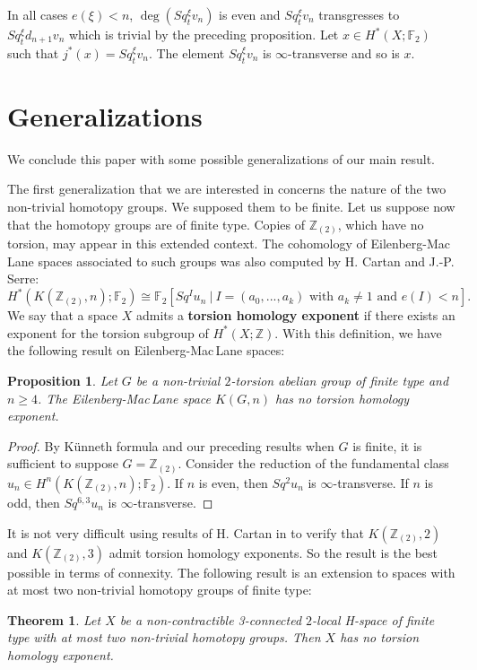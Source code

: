 \documentclass{amsart}
\newtheorem*{thm*}{Theorem}
\newtheorem*{prop*}{Proposition}
\theoremstyle{definition}
\theoremstyle{remark}
\newcommand{\Z}{\mathbb{Z}}
\newcommand{\F}{\mathbb{F}}
\renewcommand{\geq}{\geqslant}
\begin{document}
In all cases $e(\xi)<n$, $\deg(Sq^\xi_t v_n)$ is even and $Sq_{t}^\xi v_n$ transgresses to $Sq_t^\xi d_{n+1}v_n$ which is trivial by the preceding proposition. Let $x\in H^*(X;\F_2)$ such that $j^*(x)=Sq_t^\xi v_n$. The element $Sq_t^\xi v_n$ is $\infty$-transverse and so is $x$.

\section{Generalizations}\label{s:generalizations}

We conclude this paper with some possible generalizations of our main result.

The first generalization that we are interested in concerns the nature of the two non-trivial homotopy groups. We supposed them to be finite. Let us suppose now that the homotopy groups are of finite type. Copies of $\Z_{(2)}$, which have no torsion, may appear in this extended context. The cohomology of Eilenberg-Mac\,Lane spaces associated to such groups was also computed by H. Cartan and J.-P. Serre:
$$
H^*(K(\Z_{(2)},n);\F_2)\cong\F_2[Sq^Iu_n\ |\ \text{$I=(a_0,...,a_k)$ with $a_k\not=1$ and $e(I)<n$}].
$$
We say that a space $X$ admits a {\bf torsion homology exponent} if there exists an exponent for the torsion subgroup of $H^*(X;\Z)$. With this definition, we have the following result on Eilenberg-Mac\,Lane spaces:

\begin{prop*}
Let $G$ be a non-trivial $2$-torsion abelian group of finite type and $n\geq4$. The Eilenberg-Mac\,Lane space $K(G,n)$ has no torsion homology exponent.
\end{prop*}

\begin{proof}
By K\"unneth formula and our preceding results when $G$ is finite, it is sufficient to suppose $G=\Z_{(2)}$. Consider the reduction of the fundamental class $u_n\in H^n(K(\Z_{(2)},n);\F_2)$. If $n$ is even, then $Sq^{2}u_n$ is $\infty$-transverse. If $n$ is odd, then $Sq^{6,3}u_n$ is $\infty$-transverse. 
\end{proof}

It is not very difficult using results of H. Cartan in \cite{Ca55} to verify that $K(\Z_{(2)},2)$ and $K(\Z_{(2)},3)$ admit torsion homology exponents. So the result is the best possible in terms of connexity. The following result is an extension to spaces with at most two non-trivial homotopy groups of finite type:

\begin{thm*}
Let $X$ be a non-contractible 3-connected $2$-local H-space of finite type with at most two non-trivial homotopy groups. Then $X$ has no torsion homology exponent.
\end{thm*}
\end{document}
